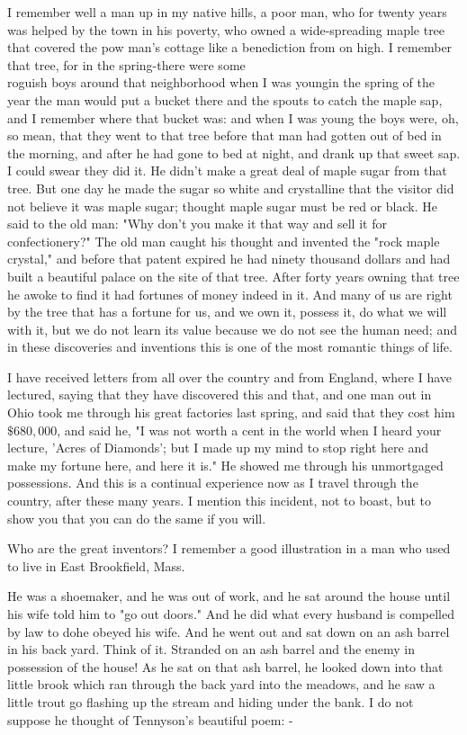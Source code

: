 \documentclass[10pt]{article}
\begin{document}
I remember well a man up in my native hills, a poor man, who for twenty years was helped by the town in his poverty, who owned a wide-spreading maple tree that covered the pow man's cottage like a benediction from on high. I remember that tree, for in the spring-there were some\\
roguish boys around that neighborhood when I was youngin the spring of the year the man would put a bucket there and the spouts to catch the maple sap, and I remember where that bucket was: and when I was young the boys were, oh, so mean, that they went to that tree before that man had gotten out of bed in the morning, and after he had gone to bed at night, and drank up that sweet sap. I could swear they did it. He didn't make a great deal of maple sugar from that tree. But one day he made the sugar so white and crystalline that the visitor did not believe it was maple sugar; thought maple sugar must be red or black. He said to the old man: "Why don't you make it that way and sell it for confectionery?" The old man caught his thought and invented the "rock maple crystal," and before that patent expired he had ninety thousand dollars and had built a beautiful palace on the site of that tree. After forty years owning that tree he awoke to find it had fortunes of money indeed in it. And many of us are right by the tree that has a fortune for us, and we own it, possess it, do what we will with it, but we do not learn its value because we do not see the human need; and in these discoveries and inventions this is one of the most romantic things of life.

I have received letters from all over the country and from England, where I have lectured, saying that they have discovered this and that, and one man out in Ohio took me through his great factories last spring, and said that they cost him $\$ 680,000$, and said he, "I was not worth a cent in the world when I heard your lecture, 'Acres of Diamonds'; but I made up my mind to stop right here and make my fortune here, and here it is." He showed me through his unmortgaged possessions. And this is a continual experience now as I travel through the country, after these many years. I mention this incident, not to boast, but to show you that you can do the same if you will.

Who are the great inventors? I remember a good illustration in a man who used to live in East Brookfield, Mass.

He was a shoemaker, and he was out of work, and he sat around the house until his wife told him to "go out doors." And he did what every husband is compelled by law to dohe obeyed his wife. And he went out and sat down on an ash barrel in his back yard. Think of it. Stranded on an ash barrel and the enemy in possession of the house! As he sat on that ash barrel, he looked down into that little brook which ran through the back yard into the meadows, and he saw a little trout go flashing up the stream and hiding under the bank. I do not suppose he thought of Tennyson's beautiful poem: -
\end{document}
